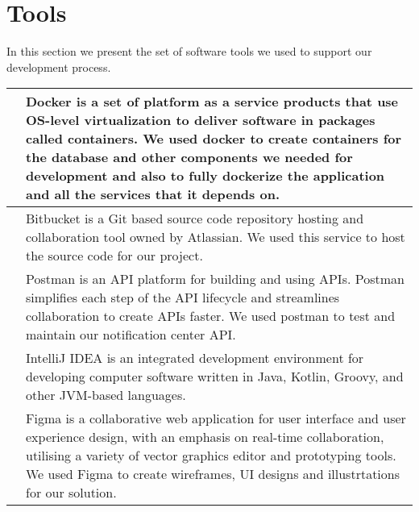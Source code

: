 \chapter{Tools}
\label{appendix:tools}
In this section we present the set of software tools we used to support our development process.

\begin{table}[hbt!]
      \begin{tabular}{ | m{} | m{} | }
            \hline
            \centering    & Docker is a set of platform as a service products that use OS-level virtualization to deliver software in packages called containers. We used docker to create containers for the database and other components we needed for development and also to fully dockerize the application and all the services that it depends on. \\
            \hline
            \centering & Bitbucket is a Git based source code repository hosting and collaboration tool owned by Atlassian. We used this service to host the source code for our project.                                                                                                                                                               \\
            \hline
            \centering   & Postman is an API platform for building and using APIs. Postman simplifies each step of the API lifecycle and streamlines collaboration to create APIs faster. We used postman to test and maintain our notification center API.                                                                                               \\
            \hline
            \centering  & IntelliJ IDEA is an integrated development environment for developing computer software written in Java, Kotlin, Groovy, and other JVM-based languages.                                                                                                                                                                        \\
            \hline
            \centering     & Figma is a collaborative web application for user interface and user experience design, with an emphasis on real-time collaboration, utilising a variety of vector graphics editor and prototyping tools. We used Figma to create wireframes, UI designs and illustrtations for our solution.                                  \\

\end{tabular}
\end{table}
